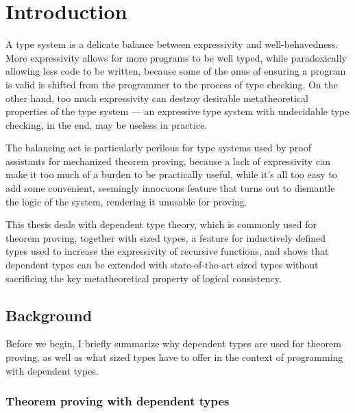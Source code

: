 \chapter{Introduction} \label{ch:introduction}

A type system is a delicate balance between expressivity and well-behavedness.
More expressivity allows for more programs to be well typed,
while paradoxically allowing less code to be written,
because some of the onus of ensuring a program is valid is shifted
from the programmer to the process of type checking.
On the other hand, too much expressivity can destroy
desirable metatheoretical properties of the type system ---
an expressive type system with undecidable type checking,
in the end, may be useless in practice.

The balancing act is particularly perilous for type systems
used by proof assistants for mechanized theorem proving,
because a lack of expressivity can make it too much of a burden to be practically useful,
while it's all too easy to add some convenient, seemingly innocuous feature
that turns out to dismantle the logic of the system,
rendering it unusable for proving.

This thesis deals with dependent type theory, which is commonly used for theorem proving,
together with sized types, a feature for inductively defined types
used to increase the expressivity of recursive functions,
and shows that dependent types can be extended with state-of-the-art sized types
without sacrificing the key metatheoretical property of logical consistency.

\section{Background}

Before we begin, I briefly summarize why dependent types are used for theorem proving,
as well as what sized types have to offer in the context of programming with dependent types.

\subsection{Theorem proving with dependent types} \label{tt}

